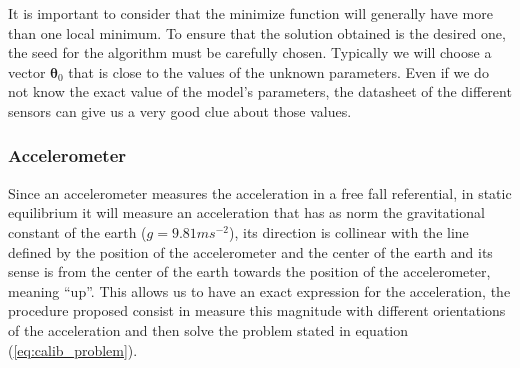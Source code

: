 \documentclass[conference]{IEEEtran}
\newcommand{\refp}[1]{(\ref{#1})}
\begin{document}
It is important to consider that the minimize function will generally have more than one local minimum. To ensure that the solution obtained is the desired one, the seed for the algorithm must be carefully chosen. Typically we will choose a vector $\boldsymbol{\theta}_0$ that is close to the values of the unknown parameters. Even if we do not know the exact value of the model's parameters, the datasheet of the different sensors can give us a very good clue about those values.\\

\subsubsection{Accelerometer}
\label{subsec:acc}
Since an accelerometer measures the acceleration in a free fall referential, in static equilibrium it will measure an acceleration that has as norm the gravitational constant of the  earth ($g = 9.81ms^{-2}$), its direction is collinear with the line defined by the position of the accelerometer and the center of the earth and its sense is from the center of the earth towards the position of the accelerometer, meaning ``up''. This allows us to have an exact expression for the acceleration, the procedure proposed consist in measure this magnitude with different orientations of the acceleration and then solve the problem stated in equation \refp{eq:calib_problem}.\\
\end{document}
